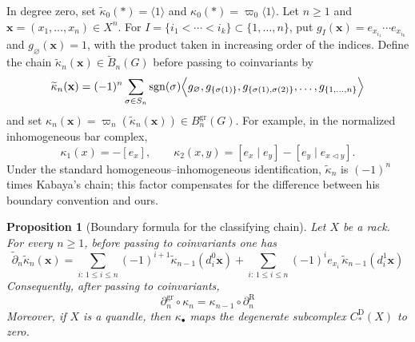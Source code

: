 \documentclass[11pt]{article}
\newtheorem{proposition}[theorem]{Proposition}
\DeclareMathOperator{\sgn}{sgn}
\newcommand{\tB}{\widetilde B}
\newcommand{\tkap}{\widetilde\kappa}
\newcommand{\td}{\widetilde\partial}
\newcommand{\gr}{\mathrm{gr}}
\newcommand{\R}{\mathrm R}
\newcommand{\D}{\mathrm D}
\begin{document}
In degree zero, set $\tkap_0(*)=\langle1\rangle$ and $\kappa_0(*)=\varpi_0\langle1\rangle$. Let $n\ge1$ and $\mathbf x=(x_1,\ldots,x_n)\in X^n$. For $I=\{i_1<\cdots<i_k\}\subset\{1,\ldots,n\}$, put $g_I(\mathbf x)=e_{x_{i_1}}\cdots e_{x_{i_k}}$ and $g_\varnothing(\mathbf x)=1$, with the product taken in increasing order of the indices. Define the chain $\tkap_n(\mathbf x)\in\tB_n(G)$ before passing to coinvariants by
\begin{equation}
\tkap_n(\mathbf x)
=
(-1)^n
\sum_{\sigma\in S_n}\sgn(\sigma)
\Bigl\langle
        g_\varnothing,
        g_{\{\sigma(1)\}},
        g_{\{\sigma(1),\sigma(2)\}},
        \ldots,
        g_{\{1,\ldots,n\}}
\Bigr\rangle
\label{eq:kappa-definition}
\end{equation}
and set $\kappa_n(\mathbf x)=\varpi_n(\tkap_n(\mathbf x))\in B_n^{\gr}(G)$. For example, in the normalized inhomogeneous bar complex,
\[
 \kappa_1(x)=-[e_x],
 \qquad
 \kappa_2(x,y)=[e_x\mid e_y]-[e_y\mid e_{x\lhd y}].
\]
Under the standard homogeneous--inhomogeneous identification, $\tkap_n$ is $(-1)^n$ times Kabaya's chain; this factor compensates for the difference between his boundary convention and ours.

\begin{proposition}[Boundary formula for the classifying chain]
\label{prop:kappa-boundary}
Let $X$ be a rack. For every $n\ge1$, before passing to coinvariants one has
\begin{equation}
\td_n\tkap_n(\mathbf x)
=
\sum_{i:\,1\le i\le n}(-1)^{i+1}\tkap_{n-1}(d_i^0\mathbf x)
+
\sum_{i:\,1\le i\le n}(-1)^i e_{x_i}\,\tkap_{n-1}(d_i^1\mathbf x)
\label{eq:kappa-homogeneous-boundary}
\end{equation}
Consequently, after passing to coinvariants,
\begin{equation}
        \partial_n^{\gr} \circ  \kappa_n
        =
        \kappa_{n-1} \circ \partial_n^\R
\label{eq:kappa-chain-map}
\end{equation}
Moreover, if $X$ is a quandle, then $\kappa_\bullet$ maps the degenerate subcomplex $C_*^\D(X)$ to zero.
\end{proposition}
\end{document}
